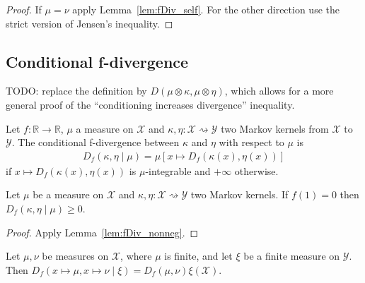 \begin{proof}\leanok
  If $\mu = \nu$ apply Lemma~\ref{lem:fDiv_self}.
  For the other direction use the strict version of Jensen's inequality.
\end{proof}



\subsection{Conditional f-divergence}

TODO: replace the definition by $D(\mu \otimes \kappa, \mu \otimes \eta)$, which allows for a more general proof of the ``conditioning increases divergence'' inequality.

\begin{definition}
  \label{def:condFDiv}
  \leanok
  Let $f : \mathbb{R} \to \mathbb{R}$, $\mu$ a measure on $\mathcal X$ and $\kappa, \eta : \mathcal X \rightsquigarrow \mathcal Y$ two Markov kernels from $\mathcal X$ to $\mathcal Y$. The conditional f-divergence between $\kappa$ and $\eta$ with respect to $\mu$ is
  \begin{align*}
  D_f(\kappa, \eta \mid \mu) = \mu\left[x \mapsto D_f(\kappa(x), \eta(x))\right]
  \end{align*}
  if $x \mapsto D_f(\kappa(x), \eta(x))$ is $\mu$-integrable and $+\infty$ otherwise.
\end{definition}

\begin{lemma}
  \label{lem:condFDiv_nonneg}
  \leanok
  Let $\mu$ be a measure on $\mathcal X$ and $\kappa, \eta : \mathcal X \rightsquigarrow \mathcal Y$ two Markov kernels. If $f(1) = 0$ then $D_f(\kappa, \eta \mid \mu) \ge 0$.
\end{lemma}

\begin{proof}\leanok
{}
Apply Lemma~\ref{lem:fDiv_nonneg}.
\end{proof}

\begin{lemma}
  \label{lem:condFDiv_const}
  \leanok
  Let $\mu, \nu$ be measures on $\mathcal X$, where $\mu$ is finite, and let $\xi$ be a finite measure on $\mathcal Y$.
  Then $D_f(x \mapsto \mu, x \mapsto \nu \mid \xi) = D_f(\mu, \nu) \xi (\mathcal X)$.
\end{lemma}


